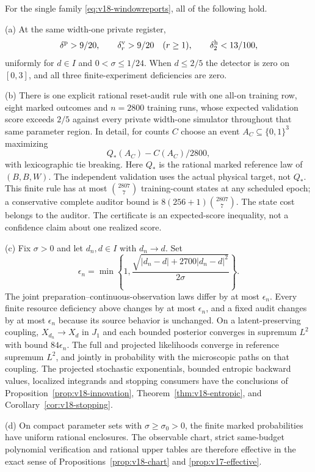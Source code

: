 \begin{theorem}
\label{thm:v18-microscopic}
For the single family \eqref{eq:v18-windowreports}, all of the following
hold.

\smallskip\noindent
\textup{(a)} At the same width-one private register,
\[
 \delta^{\rm p}>9/20,\qquad \delta^{\rm v}_r>9/20\quad(r\ge1),\qquad
 \delta^{\rm h}_2<13/100,
\]
uniformly for $d\in I$ and $0<\sigma\le1/24$.
When $d\le2/5$ the detector is zero on $[0,3]$, and all three
finite-experiment deficiencies are zero.

\smallskip\noindent
\textup{(b)} There is one explicit rational reset-audit rule with one
all-on training row, eight marked outcomes and $n=2800$ training runs,
whose expected validation score exceeds $2/5$ against every private
width-one simulator throughout that same parameter region. In detail,
for counts $C$ choose an event $A_C\subseteq\{0,1\}^3$ maximizing
\begin{equation}\label{eq:v18-concreteaudit}
 Q_*(A_C)-C(A_C)/2800,
\end{equation}
with lexicographic tie breaking. Here $Q_*$ is the rational marked
reference law of $(B,B,W)$. The independent validation uses the actual
physical target, not $Q_*$. This finite rule has at most
$\binom{2807}{7}$ training-count states at any scheduled epoch; a
conservative complete auditor bound is
$8(256+1)\binom{2807}{7}$. The state cost belongs to the auditor.
The certificate is an expected-score inequality, not a confidence claim
about one realized score.

\smallskip\noindent
\textup{(c)} Fix $\sigma>0$ and let $d_n,d\in I$ with $d_n\to d$.
Set
\begin{equation}\label{eq:v18-physicalepsilon}
 \epsilon_n=\min\left\{1,
       \frac{\sqrt{|d_n-d|+2700|d_n-d|^2}}{2\sigma}\right\}.
\end{equation}
The joint preparation--continuous-observation laws differ by at most
$\epsilon_n$. Every finite resource deficiency above changes by at most
$\epsilon_n$, and a fixed audit changes by at most $\epsilon_n$ because
its source behavior is unchanged. On a latent-preserving coupling,
$X_{d_n}\to X_d$ in $J_1$ and each bounded posterior converges in
supremum $L^2$ with bound $84\epsilon_n$. The full and projected
likelihoods converge in reference supremum $L^2$, and jointly in probability
with the microscopic paths on that coupling. The projected stochastic
exponentials, bounded entropic backward values, localized integrands and
stopping consumers have the conclusions of
Proposition~\ref{prop:v18-innovation},
Theorem~\ref{thm:v18-entropic}, and Corollary~\ref{cor:v18-stopping}.

\smallskip\noindent
\textup{(d)} On compact parameter sets with $\sigma\ge\sigma_0>0$, the
finite marked probabilities have uniform rational enclosures. The
observable chart, strict same-budget polynomial verification and rational
upper tables are therefore effective in the exact sense of
Propositions~\ref{prop:v18-chart} and \ref{prop:v17-effective}.
\end{theorem}
